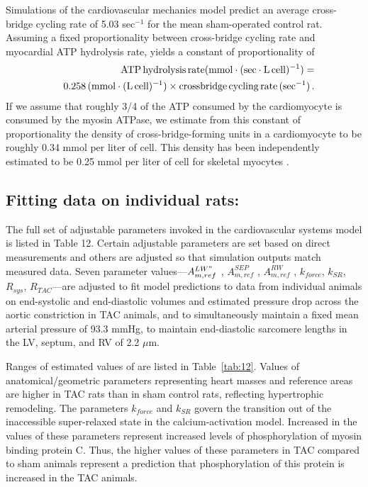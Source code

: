 \documentclass[fleqn,10pt]{physiome}
\begin{document}
Simulations of the cardiovascular mechanics model predict an average cross-bridge cycling rate of 5.03 sec$^{-1}$ for the mean sham-operated control rat. Assuming a fixed proportionality between cross-bridge cycling rate and myocardial ATP hydrolysis rate, yields a constant of proportionality of 
\begin{eqnarray}
 & & {\rm ATP\, hydrolysis\, rate (mmol\cdot(sec \cdot L \, cell)^{-1})}  = \nonumber \\
 & & {\rm 0.258 \, (mmol \cdot (L \, cell)^{-1}) \times crossbridge \, cycling \,rate \, (sec^{-1}) } \, .
\end{eqnarray}
If we assume that roughly 3/4 of the ATP consumed by the cardiomyocyte is consumed by the myosin ATPase, we estimate from this constant of proportionality the density of cross-bridge-forming units in a cardiomyocyte to be roughly 0.34 mmol per liter of cell. This density has been independently estimated to be 0.25 mmol per liter of cell for skeletal myocytes \citep{Barclay2010}.

\subsection{Fitting data on individual rats:}

The full set of adjustable parameters invoked in the cardiovascular systems model is listed in Table 12. Certain adjustable parameters are set based on direct measurements and others are adjusted so that simulation outputs match measured data. Seven parameter values---$A_{m,ref}^{LW"}$ , $A_{m,ref} ^{SEP}$ , $A_{m,ref}^{RW}$ , $k_{force}$, $k_{SR}$, $R_{sys}$, $R_{TAC}$---are adjusted to fit model predictions to data from individual animals on end-systolic and end-diastolic volumes and estimated pressure drop across the aortic constriction in TAC animals, and to simultaneously maintain a fixed mean arterial pressure of 93.3 mmHg, to maintain end-diastolic sarcomere lengths in the LV, septum, and RV of 2.2 $\mu$m. 

Ranges of estimated values of are listed in Table~\ref{tab:12}. Values of anatomical/geometric parameters representing heart masses and reference areas are higher in TAC rats than in sham control rats, reflecting hypertrophic remodeling.
The parameters $k_{force}$ and $k_{SR}$ govern the transition out of the inaccessible super-relaxed state in the calcium-activation model. Increased in the values of these parameters represent increased levels of phosphorylation of myosin binding protein C. Thus, the higher values of these parameters in TAC compared to sham animals represent a prediction that phosphorylation of this protein is increased in the TAC animals.
\end{document}
